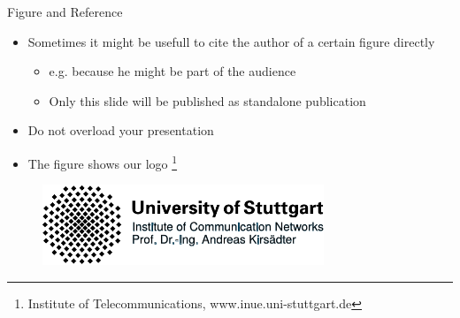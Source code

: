 \documentclass[english,american,german,aspectratio=169]{beamer}
\begin{document}
\begin{frame}{Figure and Reference }

  \begin{itemize}
    \item Sometimes it might be usefull to cite the author of a certain figure
      directly

      \begin{itemize}
        \item e.g. because he might be part of the audience
        \item Only this slide will be published as standalone publication
      \end{itemize}
    \item Do not overload your presentation
    \item The figure shows our logo \footnote{Institute of
      Telecommunications, www.inue.uni-stuttgart.de}
  \end{itemize}
  \begin{figure}
    \centering{}\includegraphics[width=0.75\textwidth]{img/logo_vector_example}
  \end{figure}

\end{frame}
\end{document}
